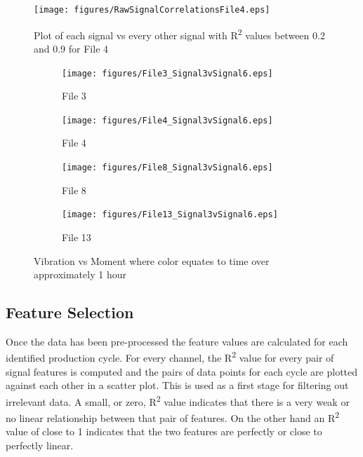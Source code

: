 \documentclass[]{article}
\begin{document}
\begin{center}
\begin{scriptsize}
 
\end{scriptsize}
\label{correlationTable}
\end{center}

\begin{figure}[H]
    \centering
    \texttt{[image: figures/RawSignalCorrelationsFile4.eps]}
    \caption{Plot of each signal vs every other signal with R\textsuperscript{2} values between 0.2 and 0.9 for File 4}
    \label{fig:RawSignalCorrelationsFile1}
\end{figure}


\begin{figure}[H]
	\captionsetup[subfigure]{justification=Centering}
    \centering
		\begin{subfigure}{.45\textwidth}
		  	\centering
    			\texttt{[image: figures/File3\_Signal3vSignal6.eps]}
		  	\caption{File 3}
		  	\label{fig:File3_Signal3vSignal6}
		\end{subfigure}
		\hspace{\fill}
		\begin{subfigure}{.45\textwidth}
		  	\centering
 		   	\texttt{[image: figures/File4\_Signal3vSignal6.eps]}
		  	\caption{File 4}
		  	\label{fig:File4_Signal3vSignal6}
		\end{subfigure}  
	\bigskip    
    \centering
		\begin{subfigure}{.45\textwidth}
		  	\centering
    			\texttt{[image: figures/File8\_Signal3vSignal6.eps]}
		  	\caption{File 8}
		  	\label{fig:File8_Signal3vSignal6}
		\end{subfigure}
		\hspace{\fill}
		\begin{subfigure}{.45\textwidth}
		  	\centering
 		   	\texttt{[image: figures/File13\_Signal3vSignal6.eps]}
		  	\caption{File 13}
		  	\label{fig:File13_Signal3vSignal6}
		\end{subfigure}
    \caption{Vibration vs Moment where color equates to time over approximately 1 hour}
    \label{fig:RawSignalCorrelationsFile1_Caption}    
\end{figure}

\subsection{Feature Selection}
Once the data has been pre-processed the feature values are calculated for each identified production cycle. For every channel, the R\textsuperscript{2} value for every pair of signal features is computed and the pairs of data points for each cycle are plotted against each other in a scatter plot. This is used as a first stage for filtering out irrelevant data. A small, or zero, R\textsuperscript{2} value indicates that there is a very weak or no linear relationship between that pair of features. On the other hand an R\textsuperscript{2} value of close to 1 indicates that the two features are perfectly or close to perfectly linear.
\end{document}
